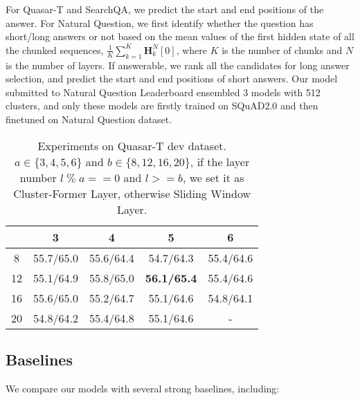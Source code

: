 For Quasar-T and SearchQA, we predict the start and end positions of the answer.
For Natural Question, we first identify whether the question has short/long answers or not based on the mean values of the first hidden state of all the chunked sequences, $\frac{1}{K}\sum_{k=1}^{K}\mathbf{H}^{N}_k[0]$, where $K$ is the number of chunks and $N$ is the number of layers. 
If answerable, we rank all the candidates for long answer selection, and predict the start and end positions of short answers.
Our model submitted to Natural Question Leaderboard ensembled 3 models with 512 clusters, and only these models are firstly trained on SQuAD2.0 and then finetuned on Natural Question dataset.
\begin{table}
\setlength{\tabcolsep}{4.3pt}
\centering
\begin{tabular}{ccccc}
\toprule
   & 3         & 4         & 5         & 6         \\
 \midrule
8  & 55.7/65.0 & 55.6/64.4 & 54.7/64.3 & 55.4/64.6 \\
12 & 55.1/64.9 & 55.8/65.0 & \textbf{56.1/65.4} & 55.4/64.6 \\
16 & 55.6/65.0 & 55.2/64.7 & 55.1/64.6 & 54.8/64.1 \\
20 & 54.8/64.2 & 55.4/64.8 & 55.1/64.6 & -   \\     \bottomrule
\end{tabular}
\caption{Experiments on Quasar-T dev dataset. $a\in \{3, 4, 5, 6\}$ and $b\in \{8,12,16,20\}$, if the layer number $l\; \%\; a==0$ and $l >= b$, we set it as Cluster-Former Layer, otherwise Sliding Window Layer. }
\label{tbl:cf_layers}
\end{table}

\subsection{Baselines}
We compare our models with several strong baselines, including:


